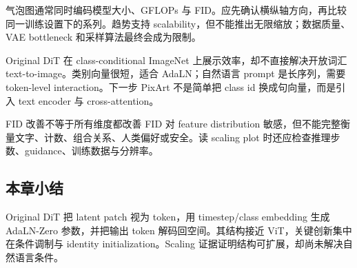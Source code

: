 
气泡图通常同时编码模型大小、GFLOPs 与 FID。应先确认横纵轴方向，再比较同一训练设置下的系列。趋势支持 scalability，但不能推出无限缩放；数据质量、VAE bottleneck 和采样算法最终会成为限制。


Original DiT 在 class-conditional ImageNet 上展示效率，却不直接解决开放词汇 text-to-image。类别向量很短，适合 AdaLN；自然语言 prompt 是长序列，需要 token-level interaction。下一步 PixArt 不是简单把 class id 换成句向量，而是引入 text encoder 与 cross-attention。

\begin{warningbox}{FID 改善不等于所有维度都改善}
FID 对 feature distribution 敏感，但不能完整衡量文字、计数、组合关系、人类偏好或安全。读 scaling plot 时还应检查推理步数、guidance、训练数据与分辨率。
\end{warningbox}

\subsection{本章小结}

Original DiT 把 latent patch 视为 token，用 timestep/class embedding 生成 AdaLN-Zero 参数，并把输出 token 解码回空间。其结构接近 ViT，关键创新集中在条件调制与 identity initialization。Scaling 证据证明结构可扩展，却尚未解决自然语言条件。

